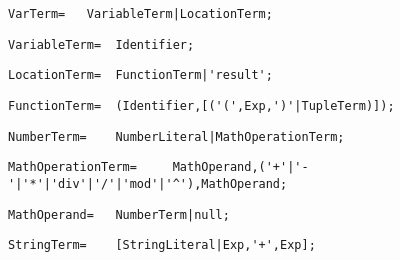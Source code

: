 \documentclass{article}
\begin{document}
    \begin{flushleft}
    \begin{lstlisting}[mathescape=true, breaklines=true]
     VarTerm= 	VariableTerm|LocationTerm;
    \end{lstlisting}
    \end{flushleft}
    \begin{flushleft}
    \begin{lstlisting}[mathescape=true, breaklines=true]
     VariableTerm= 	Identifier;
    \end{lstlisting}
    \end{flushleft}
    \begin{flushleft}
    \begin{lstlisting}[mathescape=true, breaklines=true]
     LocationTerm= 	FunctionTerm|'result';
    \end{lstlisting}
    \end{flushleft}
    \begin{flushleft}
    \begin{lstlisting}[mathescape=true, breaklines=true]
     FunctionTerm= 	(Identifier,[('(',Exp,')'|TupleTerm)]);
    \end{lstlisting}
    \end{flushleft}
    \begin{flushleft}
    \begin{lstlisting}[mathescape=true, breaklines=true]
     NumberTerm= 	NumberLiteral|MathOperationTerm;
    \end{lstlisting}
    \end{flushleft}
    \begin{flushleft}
    \begin{lstlisting}[mathescape=true, breaklines=true]
     MathOperationTerm= 	MathOperand,('+'|'-'|'*'|'div'|'/'|'mod'|'^'),MathOperand;
    \end{lstlisting}
    \end{flushleft}
    \begin{flushleft}
    \begin{lstlisting}[mathescape=true, breaklines=true]
     MathOperand= 	NumberTerm|null;
    \end{lstlisting}
    \end{flushleft}
    \begin{flushleft}
    \begin{lstlisting}[mathescape=true, breaklines=true]
     StringTerm= 	[StringLiteral|Exp,'+',Exp];
    \end{lstlisting}
    \end{flushleft}
\end{document}
